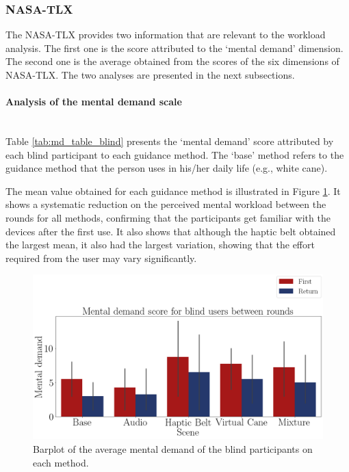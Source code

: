 \subsubsection{NASA-TLX}
\label{subsubsec:results_nasa_tlx_1}

The NASA-TLX provides two information that are relevant to the workload analysis. The first one is the score attributed to the ‘mental demand’ dimension. The second one is the average obtained from the scores of the six dimensions of NASA-TLX. The two analyses are presented in the next subsections.

\paragraph{Analysis of the mental demand scale}\mbox{}\\

Table \ref{tab:md_table_blind} presents the ‘mental demand’ score attributed by each blind participant to each guidance method. The ‘base’ method refers to the guidance method that the person uses in his/her daily life (e.g., white cane). 



The mean value obtained for each guidance method is illustrated in Figure \ref{fig:barplot_md_avg_5_scene_blind}. It shows a systematic reduction on the perceived mental workload between the rounds for all methods, confirming that the participants get familiar with the devices after the first use. It also shows that although the haptic belt obtained the largest mean, it also had the largest variation, showing that the effort required from the user may vary significantly.

\begin{figure}[!htb]
    \centering
    \includegraphics[width = 0.8\linewidth]{Resultados/Nasa/Figuras/png/barplot_md_avg_5_scene_blind.png}
    \caption{Barplot of the average mental demand of the blind participants on each method.}
    \label{fig:barplot_md_avg_5_scene_blind}
\end{figure}

